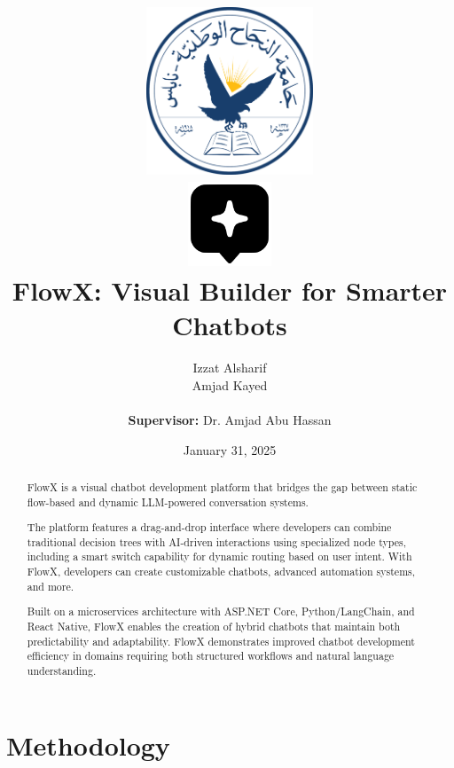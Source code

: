 \documentclass[12pt, a4paper]{report}
\title{
    \includegraphics[height=5cm]{assets/NNU_Logo.png} \\[1cm]
    \includegraphics[height=2.5cm]{assets/FlowX_Logo.png} \\[1cm]
    FlowX: Visual Builder for Smarter Chatbots
}
\author{
    Izzat Alsharif \\
    Amjad Kayed
    \\\\
    \textbf{Supervisor:} Dr. Amjad Abu Hassan
}
\date{January 31, 2025}
\begin{document}
\maketitle
\tableofcontents
\listoffigures

\begin{abstract}
FlowX is a visual chatbot development platform that bridges the gap between static flow-based and dynamic LLM-powered conversation systems. 
\par\medskip
The platform features a drag-and-drop interface where developers can combine traditional decision trees with AI-driven interactions using specialized node types, including a smart switch capability for dynamic routing based on user intent. With FlowX, developers can create customizable chatbots, advanced automation systems, and more.
\par\medskip
Built on a microservices architecture with ASP.NET Core, Python/LangChain, and React Native, FlowX enables the creation of hybrid chatbots that maintain both predictability and adaptability. FlowX demonstrates improved chatbot development efficiency in domains requiring both structured workflows and natural language understanding.
\end{abstract}





\chapter{Methodology}








\appendix




\renewcommand{\bibname}{References}


\end{document}
